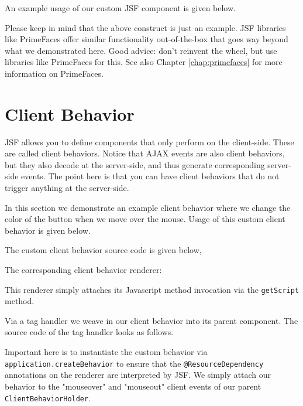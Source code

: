 An example usage of our custom JSF component is given below.

Please keep in mind that the above construct is just an example.
JSF libraries like PrimeFaces offer similar functionality out-of-the-box that goes way beyond what we demonstrated here.
Good advice: don't reinvent the wheel, but use libraries like PrimeFaces for this.
See also Chapter \ref{chap:primefaces} for more information on PrimeFaces.

\section{Client Behavior}
JSF allows you to define components that only perform on the client-side.
These are called client behaviors.
Notice that AJAX events are also client behaviors, but they also decode at the server-side, and thus generate corresponding server-side events.
The point here is that you can have client behaviors that do not trigger anything at the server-side.

In this section we demonstrate an example client behavior where we change the color of the button when we move over the mouse.
Usage of this custom client behavior is given below.


The custom client behavior source code is given below,


The corresponding client behavior renderer:

This renderer simply attaches its Javascript method invocation via the \texttt{getScript} method.

Via a tag handler we weave in our client behavior into its parent component.
The source code of the tag handler looks as follows.

Important here is to instantiate the custom behavior via \texttt{application.createBehavior} to ensure that the \texttt{@ResourceDependency} annotations on the renderer are interpreted by JSF.
We simply attach our behavior to the "mouseover" and "mouseout" client events of our parent \texttt{ClientBehaviorHolder}.

